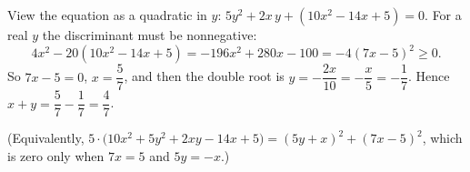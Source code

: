 View the equation as a quadratic in $y$: $5y^2+2x\,y+(10x^2-14x+5)=0$. For a real $y$ the discriminant must be nonnegative:
\[
4x^2-20(10x^2-14x+5)=-196x^2+280x-100=-4(7x-5)^2\ge0 .
\]
So $7x-5=0$, $x=\dfrac{5}{7}$, and then the double root is $y=-\dfrac{2x}{10}=-\dfrac{x}{5}=-\dfrac{1}{7}$. Hence $x+y=\dfrac{5}{7}-\dfrac{1}{7}=\boxed{\dfrac{4}{7}}$.

(Equivalently, $5\cdot\bigl(10x^2+5y^2+2xy-14x+5\bigr)=(5y+x)^2+(7x-5)^2$, which is zero only when $7x=5$ and $5y=-x$.)
